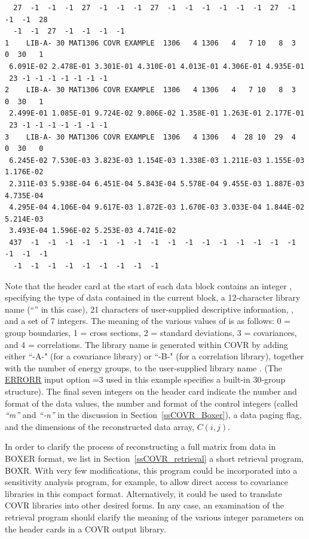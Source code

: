 \begin{verbatim}
  27  -1  -1  -1  27  -1  -1  -1  27  -1  -1  -1  -1  -1  -1  27  -1  -1  -1  28
  -1  -1  27  -1  -1  -1  -1
1    LIB-A- 30 MAT1306 COVR EXAMPLE  1306   4 1306   4   7 10   8  3   0  30   1
 6.091E-02 2.478E-01 3.301E-01 4.310E-01 4.013E-01 4.306E-01 4.935E-01
 23 -1 -1 -1 -1 -1 -1 -1
2    LIB-A- 30 MAT1306 COVR EXAMPLE  1306   4 1306   4   7 10   8  3   0  30   1
 2.499E-01 1.085E-01 9.724E-02 9.806E-02 1.358E-01 1.263E-01 2.177E-01
 23 -1 -1 -1 -1 -1 -1 -1
3    LIB-A- 30 MAT1306 COVR EXAMPLE  1306   4 1306   4  28 10  29  4   0  30   0
 6.245E-02 7.530E-03 3.823E-03 1.154E-03 1.338E-03 1.211E-03 1.155E-03 1.176E-02
 2.311E-03 5.938E-04 6.451E-04 5.843E-04 5.578E-04 9.455E-03 1.887E-03 4.735E-04
 4.295E-04 4.106E-04 9.617E-03 1.872E-03 1.670E-03 3.033E-04 1.844E-02 5.214E-03
 3.493E-04 1.596E-02 5.253E-03 4.741E-02
 437  -1  -1  -1  -1  -1  -1  -1  -1  -1  -1  -1  -1  -1  -1  -1  -1  -1  -1  -1
  -1  -1  -1  -1  -1  -1  -1  -1  -1
\end{verbatim}
\normalsize

Note that the header card at the start of each data block contains an
integer , specifying the type of data contained in the
current block, a 12-character library name (``'' in
this case), 21 characters of user-supplied descriptive information,
, and a set of 7 integers.  The meaning of
the various values of  is as follows: 0 = group
boundaries, 1 = cross sections, 2 = standard deviations, 3 =
covariances, and 4 = correlations.  The library name is generated within
COVR by adding either ``-A-" (for a covariance library) or
``-B-" (for a correlation library), together with the number of
energy groups, to the user-supplied library name .  (The
\hyperlink{sERRORRhy}{ERRORR} input option =3 used in
this example specifies a built-in 30-group structure).  The final
seven integers on the header card indicate the number and format
of the data values, the number and format of the control integers
(called {\it ``m''} and {\it ``-n''} in the discussion in
Section~\ref{ssCOVR_Boxer}), a data paging flag, and the
dimensions of the reconstructed data array, $C(i,j)$.

In order to clarify the process of reconstructing a full matrix from
data in BOXER format, we list in Section~\ref{ssCOVR_retrieval} a short
retrieval program, BOXR.  With very few modifications, this program could be
incorporated into a sensitivity analysis program, for example, to allow
direct access to covariance libraries\cite{COVFILS2} in this compact
format.  Alternatively, it could be used to translate COVR libraries
into other desired forms.  In any case, an examination of the retrieval
program should clarify the meaning of the various integer parameters on
the header cards in a COVR output library.


